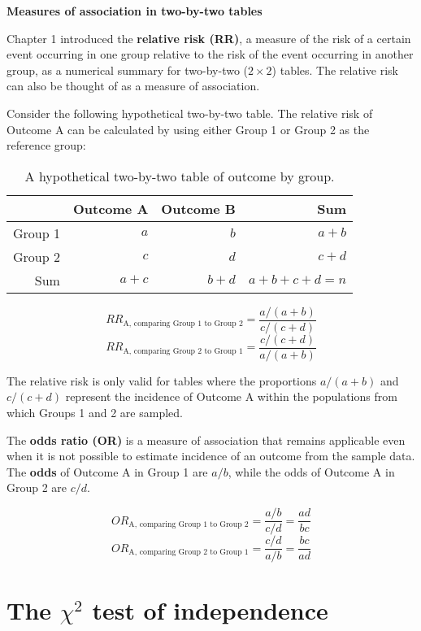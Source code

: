 \documentclass[letterpaper,12pt,twoside,]{pinp}
\begin{document}
\vspace{0.5cm}

\textbf{Measures of association in two-by-two tables}

Chapter 1 introduced the \textbf{relative risk (RR)}, a measure of the
risk of a certain event occurring in one group relative to the risk of
the event occurring in another group, as a numerical summary for
two-by-two (\(2 \times 2\)) tables. The relative risk can also be
thought of as a measure of association.

Consider the following hypothetical two-by-two table. The relative risk
of Outcome A can be calculated by using either Group 1 or Group 2 as the
reference group:

\begin{table}[h!]
    \centering
    \begin{tabular}{r|rrr}
        \hline
        & Outcome A & Outcome B & Sum\\ 
        \hline
        Group 1 & $a$ & $b$ & $a + b$ \\ 
        Group 2 & $c$ & $d$ & $c + d$ \\
        Sum & $a + c$ & $b + d$ & $a + b + c + d = n$ \\
        \hline
    \end{tabular}   
    \caption{A hypothetical two-by-two table of outcome by group.}
\end{table}

\[RR_{\text{A, comparing Group 1 to Group 2}} = \dfrac{a/(a + b)}{c/(c+d)} \]
\[RR_{\text{A, comparing Group 2 to Group 1}} = \dfrac{c/(c + d)}{a/(a+b)} \]

The relative risk is only valid for tables where the proportions
\(a/(a + b)\) and \(c/(c + d)\) represent the incidence of Outcome A
within the populations from which Groups 1 and 2 are sampled.

The \textbf{odds ratio (OR)} is a measure of association that remains
applicable even when it is not possible to estimate incidence of an
outcome from the sample data. The \textbf{odds} of Outcome A in Group 1
are \(a/b\), while the odds of Outcome A in Group 2 are \(c/d\).

\[OR_{\text{A, comparing Group 1 to Group 2}} = \dfrac{a/b}{c/d} = \dfrac{ad}{bc} \]
\[OR_{\text{A, comparing Group 2 to Group 1}} = \dfrac{c/d}{a/b} = \dfrac{bc}{ad} \]

\vspace{0.5cm}

\hypertarget{the-chi2-test-of-independence}{%
\section{\texorpdfstring{The \(\chi^2\) test of
independence}{The \textbackslash chi\^{}2 test of independence}}\label{the-chi2-test-of-independence}}
\end{document}
